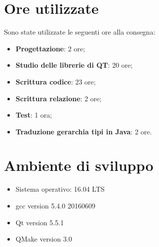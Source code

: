 \documentclass[a4paper,10pt]{article}
\begin{document}
        \section{Ore utilizzate}
        Sono state utilizzate le seguenti ore alla consegna:
        \begin{itemize}
            \item \textbf{Progettazione}: 2 ore;
            \item \textbf{Studio delle librerie di QT}: 20 ore;
            \item \textbf{Scrittura codice}: 23 ore;
            \item \textbf{Scrittura relazione}: 2 ore;
            \item \textbf{Test}: 1 ora;
            \item \textbf{Traduzione gerarchia tipi in Java}: 2 ore.
        \end{itemize}
        \section{Ambiente di sviluppo}
        \begin{itemize}
            \item Sistema operativo: 16.04 LTS
            \item gcc version 5.4.0 20160609
            \item Qt version 5.5.1
            \item QMake version 3.0
        \end{itemize}
\end{document}
